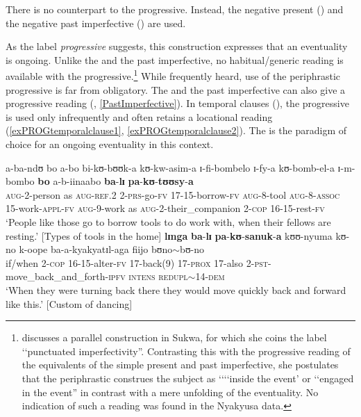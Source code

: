 There is no  counterpart to the progressive. Instead, the negative present () and the negative past imperfective () are used.

As the label \textit{progressive} suggests, this construction expresses that an eventuality is ongoing. Unlike the  and the past imperfective, no habitual/generic reading is available with the progressive.\footnote{\citet[168--174]{KershnerT2002} discusses a parallel construction in Sukwa, for which she coins the label \lq\lq punctuated imperfectivity''. Contrasting this with the progressive reading of the  equivalents of the simple present and past imperfective, she postulates that the periphrastic construes the subject as \lq\lq\lq\lq inside the event' or \lq\lq engaged in the event'' in contrast with a mere unfolding of the eventuality. No indication of such a reading was found in the Nyakyusa data.} While frequently heard, use of the periphrastic progressive is far from obligatory. The  and the past imperfective can also give a progressive reading  (, \ref{PastImperfective}).
In temporal clauses (), the progressive is used only infrequently and often retains a locational reading (\ref{exPROGtemporalclause1}, \ref{exPROGtemporalclause2}). The  is the paradigm of choice for an ongoing eventuality in this context.

\begin{exe}
\ex \label{exPROGtemporalclause1}
\gll a-ba-ndʊ bo a-bo bi-kʊ-bʊʊk-a kʊ-kw-asim-a ɪ-fi-bombelo ɪ-fy-a kʊ-bomb-el-a ɪ-m-bombo \textbf{bo} a-b-iinaabo \textbf{ba}-\textbf{lɪ} \textbf{pa}-\textbf{kʊ}-\textbf{tʊʊsy}-\textbf{a}\\
\textsc{aug}-2-person as \textsc{aug}-\textsc{ref.2} 2-\textsc{prs}-go-\textsc{fv} 17-15-borrow-\textsc{fv} \textsc{aug}-8-tool \textsc{aug}-8-\textsc{assoc} 15-work-\textsc{appl}-\textsc{fv} \textsc{aug}-9-work as \textsc{aug}-2-their\_companion 2-\textsc{cop} 16-15-rest-\textsc{fv}\\
\glt \lq People like those go to borrow tools to do work with, when their fellows are resting.' [Types of tools in the home]
\ex \label{exPROGtemporalclause2}
\gll \textbf{lɪnga} \textbf{ba}-\textbf{lɪ} \textbf{pa}-\textbf{kʊ}-\textbf{sanuk}-\textbf{a} kʊʊ-nyuma kʊ-no k-oope ba-a-kyakyatɪl-aga fiijo bʊno$\sim$bʊ-no\\
if/when 2-\textsc{cop} 16-15-alter-\textsc{fv} 17-back(9) 17-\textsc{prox} 17-also 2-\textsc{pst}-move\_back\_and\_forth-\textsc{ipfv} \textsc{intens} \textsc{redupl}$\sim$14-\textsc{dem}\\
\glt \lq When they were turning back there they would move quickly back and forward like this.' [Custom of dancing]
\end{exe}

